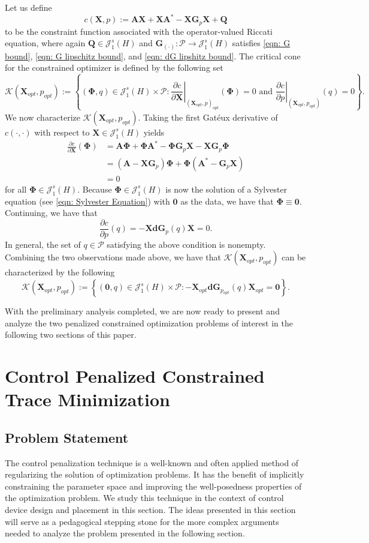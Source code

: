 \documentclass{amsart}
\newcommand{\sJ}{\mathscr J}
\newcommand{\p}[1]{\left( {#1} \right)}
\newcommand{\Br}[1]{\left\{ #1 \right\}}
\newcommand{\sP}{\mathcal{P}}
\newcommand{\bA}{\mathbf A}
\newcommand{\bX}{\mathbf X}
\newcommand{\bQ}{\mathbf Q}
\newcommand{\bG}{\mathbf G}
\newcommand{\bPhi}{\boldsymbol{\Phi}}
\newcommand{\bd}{\mathbf d}
\begin{document}
Let us define 
$$
c(\bX, p) := \bA\bX + \bX\bA^* - \bX\bG_p\bX+\bQ
$$
to be the constraint function associated with the operator-valued Riccati equation, where again $\bQ \in \sJ_1^s(H)$ and $\bG_{(\cdot)} : \sP \rightarrow \sJ_1^s(H)$ satisfies \eqref{eqn: G bound}, \eqref{eqn: G lipschitz bound}, and \eqref{eqn: dG lipshitz bound}. The critical cone for the constrained optimizer is defined by the following set
$$
    \mathcal K(\bX_{opt},p_{opt}) :=
    \Br{
        \p{\bPhi,q} \in \sJ_1^s(H) \times \sP : 
        \left.\frac{\partial c}{\partial \bX}\right|_{\p{\bX_{opt},p}_{opt}}(\bPhi) = 0 \textrm{ and } 
        \left.\frac{\partial c}{\partial p}\right|_{\p{\bX_{opt}, p_{opt}}}(q) = 0
    }.
$$
We now characterize $\mathcal K(\bX_{opt}, p_{opt})$. Taking the first Gat\'eux derivative of $c(\cdot, \cdot)$ with respect to $\bX \in \sJ_1^s(H)$ yields
$$
\begin{aligned}
    \frac{\partial c}{\partial \bX}(\bPhi) 
    &= \bA\bPhi + \bPhi \bA^* - \bPhi\bG_p\bX - \bX\bG_p\bPhi \\
    &=\p{\bA-\bX\bG_p}\bPhi + \bPhi\p{\bA^* - \bG_p \bX} \\
    &=0
\end{aligned}
$$
for all $\bPhi \in\sJ_1^s(H)$. Because $\bPhi \in \sJ_1^s(H)$ is now the solution of a Sylvester equation (see \eqref{eqn: Sylvester Equation}) with $\mathbf 0$ as the data, we have that $\bPhi \equiv \mathbf 0$. Continuing, we have that 
$$
    \frac{\partial c}{\partial p}(q) = -\bX\bd\bG_p(q) \bX = 0.
$$
In general, the set of $q \in \sP$ satisfying the above condition is nonempty. Combining the two observations made above, we have that $\mathcal K(\bX_{opt}, p_{opt})$ can be characterized by the following
\begin{equation} \label{eqn: critical cone}
    \mathcal K(\bX_{opt}, p_{opt}) := \Br{\p{\mathbf 0, q} \in \sJ_1^s(H)\times\sP : -\bX_{opt}\bd\bG_{p_{opt}}(q)\bX_{opt} = \mathbf 0}.
\end{equation}

With the preliminary analysis completed, we are now ready to present and analyze the two penalized constrained optimization problems of interest in the following two sections of this paper. 

\section{Control Penalized Constrained Trace Minimization}
\label{sec: problem 1}
\subsection{Problem Statement}
The control penalization technique \cite{troltzsch2010optimal} is a well-known and often applied method of regularizing the solution of optimization problems. It has the benefit of implicitly constraining the parameter space and improving the well-posedness properties of the optimization problem. We study this technique in the context of control device design and placement in this section. The ideas presented in this section will serve as a pedagogical stepping stone for the more complex arguments needed to analyze the problem presented in the following section. 
\end{document}
